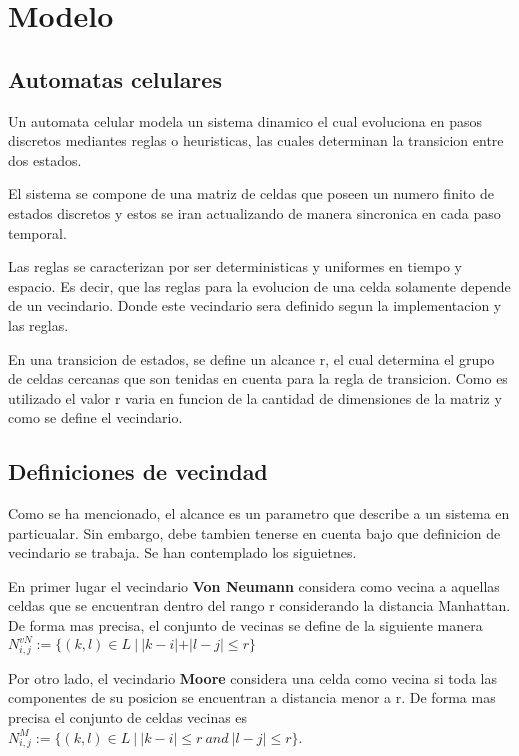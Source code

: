 \section{Modelo}\label{sec:modelo}

\subsection{Automatas celulares}\label{subsec:automatas-celulares}

Un automata celular modela un sistema dinamico el cual evoluciona en pasos discretos mediantes reglas o heuristicas,
las cuales determinan la transicion entre dos estados.

El sistema se compone de una matriz de celdas que poseen un numero finito de estados discretos y estos se iran actualizando
de manera sincronica en cada paso temporal.

Las reglas se caracterizan por ser deterministicas y uniformes en tiempo y espacio. Es decir, que las reglas para la evolucion
de una celda solamente depende de un vecindario. Donde este vecindario sera definido segun la implementacion y las reglas.

En una transicion de estados, se define un alcance r, el cual determina el grupo de celdas cercanas que son tenidas
en cuenta para la regla de transicion. Como es utilizado el valor r varia en funcion de la cantidad de dimensiones de
la matriz y como se define el vecindario.

\subsection{Definiciones de vecindad}\label{subsec:definiciones-de-vecindad}
Como se ha mencionado, el alcance es un parametro que describe a un sistema en particualar. Sin embargo, debe tambien
tenerse en cuenta bajo que definicion de vecindario se trabaja. Se han contemplado los siguietnes.

En primer lugar el vecindario \textbf{Von Neumann} considera como vecina a aquellas celdas que se encuentran dentro del rango r
considerando la distancia Manhattan. De forma mas precisa, el conjunto de vecinas se define de la siguiente manera
$N_{i,j}^{vN}:=\{(k,l) \in L\ |\ |k-i|+ |l - j| \leq r\}$

Por otro lado, el vecindario \textbf{Moore} considera una celda como vecina si toda las componentes de su posicion se encuentran
a distancia menor a r. De forma mas precisa el conjunto de celdas vecinas es
$N_{i,j}^{M}:=\{(k,l) \in L\ |\ |k-i|\leq r\ and\ |l - j| \leq r \}$.


